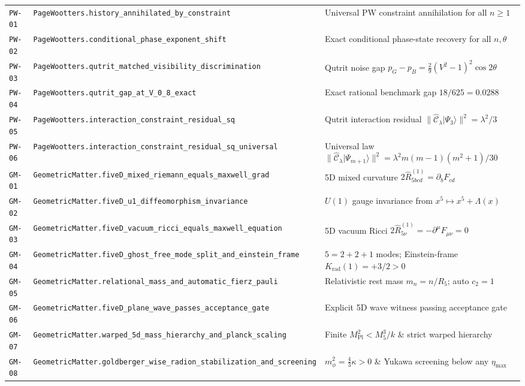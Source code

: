 \documentclass[11pt,a4paper]{article}
\theoremstyle{plain}
\theoremstyle{remark}
\newcommand{\dd}{\partial}
\newcommand{\Rhat}{\widehat{R}}
\newcommand{\Ccal}{\widehat{\mathcal{C}}}
\newcommand{\code}[1]{\texttt{\small #1}}
\begin{document}
\begin{table}[t]
\begin{tabular}{@{}l >{\tiny}l >{\raggedright\arraybackslash}p{7.1cm}@{}}
\midrule
\code{PW-01} & \code{PageWootters.history\_annihilated\_by\_constraint} & Universal PW constraint annihilation for all $n\ge 1$ \\
\code{PW-02} & \code{PageWootters.conditional\_phase\_exponent\_shift} & Exact conditional phase-state recovery for all $n,\theta$ \\
\code{PW-03} & \code{PageWootters.qutrit\_matched\_visibility\_discrimination} & Qutrit noise gap $p_G - p_B = \tfrac{2}{9}(V^2-1)^2\cos 2\theta$ \\
\code{PW-04} & \code{PageWootters.qutrit\_gap\_at\_V\_0\_8\_exact} & Exact rational benchmark gap $18/625 = 0.0288$ \\
\code{PW-05} & \code{PageWootters.interaction\_constraint\_residual\_sq} & Qutrit interaction residual $\|\Ccal_\lambda|\Psi_3\rangle\|^2 = \lambda^2/3$ \\
\code{PW-06} & \code{PageWootters.interaction\_constraint\_residual\_sq\_universal} & Universal law $\|\Ccal_\lambda|\Psi_{m+1}\rangle\|^2 = \lambda^2 m(m-1)(m^2+1)/30$ \\
\midrule
\code{GM-01} & \code{GeometricMatter.fiveD\_mixed\_riemann\_equals\_maxwell\_grad} & 5D mixed curvature $2\Rhat^{(1)}_{5bcd} = \dd_b F_{cd}$ \\
\code{GM-02} & \code{GeometricMatter.fiveD\_u1\_diffeomorphism\_invariance} & $U(1)$ gauge invariance from $x^5 \mapsto x^5 + \Lambda(x)$ \\
\code{GM-03} & \code{GeometricMatter.fiveD\_vacuum\_ricci\_equals\_maxwell\_equation} & 5D vacuum Ricci $2\Rhat^{(1)}_{5\nu} = -\dd^\mu F_{\mu\nu} = 0$ \\
\code{GM-04} & \code{GeometricMatter.fiveD\_ghost\_free\_mode\_split\_and\_einstein\_frame} & $5 = 2+2+1$ modes; Einstein-frame $K_{\mathrm{rad}}(1) = +3/2 > 0$ \\
\code{GM-05} & \code{GeometricMatter.relational\_mass\_and\_automatic\_fierz\_pauli} & Relativistic rest mass $m_n = n/R_5$; auto $c_2 = 1$ \\
\code{GM-06} & \code{GeometricMatter.fiveD\_plane\_wave\_passes\_acceptance\_gate} & Explicit 5D wave witness passing acceptance gate \\
\code{GM-07} & \code{GeometricMatter.warped\_5d\_mass\_hierarchy\_and\_planck\_scaling} & Finite $M_{\mathrm{Pl}}^2 < M_5^3/k$ \& strict warped hierarchy \\
\code{GM-08} & \code{GeometricMatter.goldberger\_wise\_radion\_stabilization\_and\_screening} & $m_\phi^2 = \tfrac{4}{3}\kappa > 0$ \& Yukawa screening below any $\eta_{\max}$ \\

\end{tabular}
\end{table}
\end{document}
